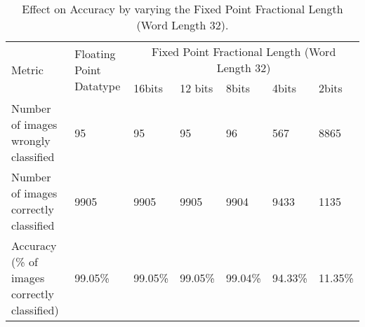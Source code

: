 \begin{table}[h]
\centering
\caption{Effect on Accuracy by varying the Fixed Point Fractional Length (Word Length 32).}
\label{Results Fixed1}
\begin{tabular}{||m{3cm}|m{1.5cm}|m{1.5cm}|m{1.5cm}|m{1.5cm}|m{1.5cm}|m{1.5cm}||}
\hline
\multirow{2}{*}{Metric} & \multirow{2}{*}{\parbox{1.5cm}{Floating Point Datatype}} & \multicolumn{5}{|c||}{ Fixed Point Fractional Length (Word Length 32)} \\[1.5ex]\cline{3-7}
& & 16bits&12 bits &8bits&4bits&2bits \\[1.5ex]
\hline
\hline
Number of images wrongly classified   & 95 &95 &95 &96 &567 &8865\\
\hline
Number of images correctly classified &9905&9905&9905&9904&9433&1135\\
\hline
Accuracy (\% of images correctly classified)&99.05\%&99.05\%&99.05\%&99.04\%&94.33\%&11.35\%\\
\hline
\end{tabular}

\end{table}